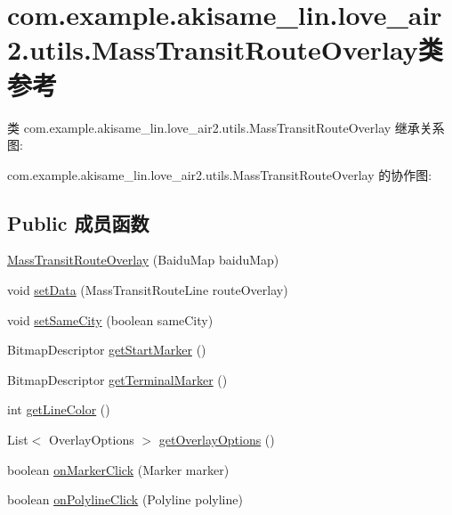\hypertarget{classcom_1_1example_1_1akisame__lin_1_1love__air2_1_1utils_1_1_mass_transit_route_overlay}{}\section{com.\+example.\+akisame\+\_\+lin.\+love\+\_\+air2.\+utils.\+Mass\+Transit\+Route\+Overlay类 参考}
\label{classcom_1_1example_1_1akisame__lin_1_1love__air2_1_1utils_1_1_mass_transit_route_overlay}


类 com.\+example.\+akisame\+\_\+lin.\+love\+\_\+air2.\+utils.\+Mass\+Transit\+Route\+Overlay 继承关系图\+:


com.\+example.\+akisame\+\_\+lin.\+love\+\_\+air2.\+utils.\+Mass\+Transit\+Route\+Overlay 的协作图\+:
\subsection*{Public 成员函数}
\begin{DoxyCompactItemize}
\item 
\mbox{\hyperlink{classcom_1_1example_1_1akisame__lin_1_1love__air2_1_1utils_1_1_mass_transit_route_overlay_aae6920db4e829a36c19599734469b063}{Mass\+Transit\+Route\+Overlay}} (Baidu\+Map baidu\+Map)
\item 
void \mbox{\hyperlink{classcom_1_1example_1_1akisame__lin_1_1love__air2_1_1utils_1_1_mass_transit_route_overlay_a367159dcbe3a55a7c9b007ccfb0d2f2d}{set\+Data}} (Mass\+Transit\+Route\+Line route\+Overlay)
\item 
void \mbox{\hyperlink{classcom_1_1example_1_1akisame__lin_1_1love__air2_1_1utils_1_1_mass_transit_route_overlay_a7b0a634f0e90d942fe7c616c227bcb01}{set\+Same\+City}} (boolean same\+City)
\item 
Bitmap\+Descriptor \mbox{\hyperlink{classcom_1_1example_1_1akisame__lin_1_1love__air2_1_1utils_1_1_mass_transit_route_overlay_a0c63e43bfdfa6c7a8e3c4667b6a31afd}{get\+Start\+Marker}} ()
\item 
Bitmap\+Descriptor \mbox{\hyperlink{classcom_1_1example_1_1akisame__lin_1_1love__air2_1_1utils_1_1_mass_transit_route_overlay_a9ffe3cadedad6eb0d1316d9eb23b5d30}{get\+Terminal\+Marker}} ()
\item 
int \mbox{\hyperlink{classcom_1_1example_1_1akisame__lin_1_1love__air2_1_1utils_1_1_mass_transit_route_overlay_af1fd2cca56e17bb41a916c13c7b037d6}{get\+Line\+Color}} ()
\item 
List$<$ Overlay\+Options $>$ \mbox{\hyperlink{classcom_1_1example_1_1akisame__lin_1_1love__air2_1_1utils_1_1_mass_transit_route_overlay_a2f2e4c25055afd0ef2149d5f65132ec2}{get\+Overlay\+Options}} ()
\item 
boolean \mbox{\hyperlink{classcom_1_1example_1_1akisame__lin_1_1love__air2_1_1utils_1_1_mass_transit_route_overlay_a3e6444eecb1b201b12c3b43bd0faec0d}{on\+Marker\+Click}} (Marker marker)
\item 
boolean \mbox{\hyperlink{classcom_1_1example_1_1akisame__lin_1_1love__air2_1_1utils_1_1_mass_transit_route_overlay_a9cd10853913857c040887912d4af2bbd}{on\+Polyline\+Click}} (Polyline polyline)
\end{DoxyCompactItemize}

